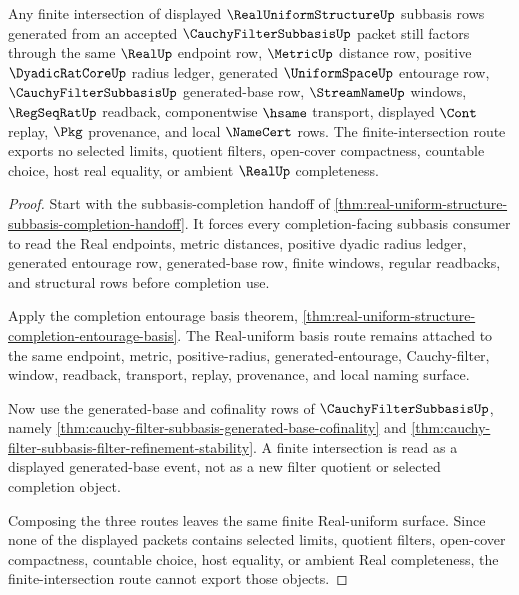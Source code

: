 \begin{theorem}
\label{thm:real-uniform-structure-finite-intersection-subbasis}
Any finite intersection of displayed $\RealUniformStructureUp$ subbasis rows generated from an accepted $\CauchyFilterSubbasisUp$ packet still factors through the same $\RealUp$ endpoint row, $\MetricUp$ distance row, positive $\DyadicRatCoreUp$ radius ledger, generated $\UniformSpaceUp$ entourage row, $\CauchyFilterSubbasisUp$ generated-base row, $\StreamNameUp$ windows, $\RegSeqRatUp$ readback, componentwise $\hsame$ transport, displayed $\Cont$ replay, $\Pkg$ provenance, and local $\NameCert$ rows. The finite-intersection route exports no selected limits, quotient filters, open-cover compactness, countable choice, host real equality, or ambient $\RealUp$ completeness.
\end{theorem}
\begin{proof}
Start with the subbasis-completion handoff of \autoref{thm:real-uniform-structure-subbasis-completion-handoff}. It forces every completion-facing subbasis consumer to read the Real endpoints, metric distances, positive dyadic radius ledger, generated entourage row, generated-base row, finite windows, regular readbacks, and structural rows before completion use.

Apply the completion entourage basis theorem, \autoref{thm:real-uniform-structure-completion-entourage-basis}. The Real-uniform basis route remains attached to the same endpoint, metric, positive-radius, generated-entourage, Cauchy-filter, window, readback, transport, replay, provenance, and local naming surface.

Now use the generated-base and cofinality rows of $\CauchyFilterSubbasisUp$, namely \autoref{thm:cauchy-filter-subbasis-generated-base-cofinality} and \autoref{thm:cauchy-filter-subbasis-filter-refinement-stability}. A finite intersection is read as a displayed generated-base event, not as a new filter quotient or selected completion object.

Composing the three routes leaves the same finite Real-uniform surface. Since none of the displayed packets contains selected limits, quotient filters, open-cover compactness, countable choice, host equality, or ambient Real completeness, the finite-intersection route cannot export those objects.
\end{proof}

